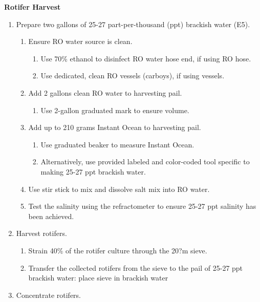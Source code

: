 \documentclass[
  letterpaper,
  DIV=11,
  numbers=noendperiod]{scrreprt}
\providecommand{\tightlist}{%
  \setlength{\itemsep}{0pt}\setlength{\parskip}{0pt}}\usepackage{longtable,booktabs,array}
\begin{document}
\textbf{Rotifer Harvest}

\begin{enumerate}
\def\labelenumi{\arabic{enumi}.}
\item
  Prepare two gallons of 25-27 part-per-thousand (ppt) brackish water
  (E5).

  \begin{enumerate}
  \def\labelenumii{\arabic{enumii}.}
  \tightlist
  \item
    Ensure RO water source is clean.

    \begin{enumerate}
    \def\labelenumiii{\arabic{enumiii}.}
    \tightlist
    \item
      Use 70\% ethanol to disinfect RO water hose end, if using RO hose.
    \item
      Use dedicated, clean RO vessels (carboys), if using vessels.
    \end{enumerate}
  \item
    Add 2 gallons clean RO water to harvesting pail.

    \begin{enumerate}
    \def\labelenumiii{\arabic{enumiii}.}
    \tightlist
    \item
      Use 2-gallon graduated mark to ensure volume.
    \end{enumerate}
  \item
    Add up to 210 grams Instant Ocean to harvesting pail.

    \begin{enumerate}
    \def\labelenumiii{\arabic{enumiii}.}
    \tightlist
    \item
      Use graduated beaker to measure Instant Ocean.
    \item
      Alternatively, use provided labeled and color-coded tool specific
      to making 25-27 ppt brackish water.
    \end{enumerate}
  \item
    Use stir stick to mix and dissolve salt mix into RO water.
  \item
    Test the salinity using the refractometer to ensure 25-27 ppt
    salinity has been achieved.
  \end{enumerate}
\item
  Harvest rotifers.

  \begin{enumerate}
  \def\labelenumii{\arabic{enumii}.}
  \tightlist
  \item
    Strain 40\% of the rotifer culture through the 20?m sieve.
  \item
    Transfer the collected rotifers from the sieve to the pail of 25-27
    ppt brackish water: place sieve in brackish water
  \end{enumerate}
\item
  Concentrate rotifers.


\end{enumerate}
\end{document}
